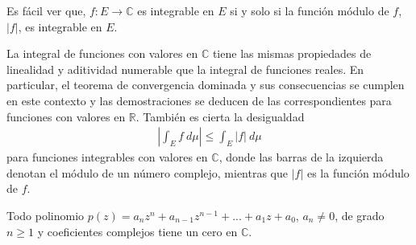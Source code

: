 \begin{obs}
Es fácil ver que, $f: E \longrightarrow \mathbb{C}$ es integrable en $E$ si y solo si la función módulo de $f$, $|f|$, es integrable en $E$.
\end{obs}
\begin{obs}
La integral de funciones con valores en $\mathbb{C}$ tiene las mismas propiedades de linealidad y aditividad numerable que la integral de funciones reales. En particular, el teorema de convergencia dominada y sus consecuencias se cumplen en este contexto y las demostraciones se deducen de las correspondientes para funciones con valores en $\mathbb{R}$. También es cierta la desigualdad
\begin{align*}
    \left| \int_{E}{f \ d\mu} \right| \leq \int_{E}{|f| \ d\mu}
\end{align*}
para funciones integrables con valores en $\mathbb{C}$, donde las barras de la izquierda denotan el módulo de un número complejo, mientras que $|f|$ es la función módulo de $f$.
\end{obs}

\begin{teo}
Todo polinomio $p(z) = a_nz^n + a_{n-1}z^{n-1} + ... + a_1z + a_0$, $a_n \not = 0$, de grado $n \ge 1$ y coeficientes complejos tiene un cero en $\mathbb{C}$.
\end{teo}